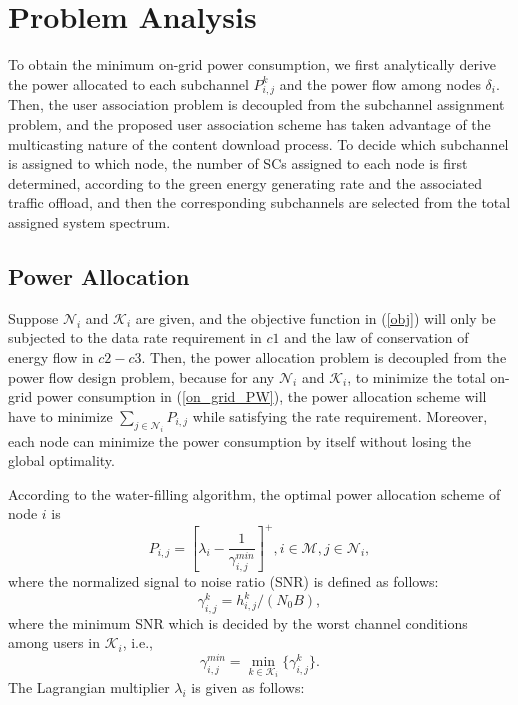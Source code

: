 \documentclass[journal,12pt,onecolumn]{IEEEtran}
\begin{document}
\section{Problem Analysis}
To obtain the minimum on-grid power consumption, we first analytically derive the power allocated to each subchannel $P_{i,j}^k$ and the power flow among nodes $\delta_i$. Then, the user association problem is decoupled from the subchannel assignment problem, and the proposed user association scheme has taken advantage of the multicasting nature of the content download process. To decide which subchannel is assigned to which node, the number of SCs assigned to each node is first determined, according to the green energy generating rate and the associated traffic offload, and then the corresponding subchannels are selected from the total assigned system spectrum. 
\subsection{Power Allocation}
Suppose $\mathcal{N}_i$ and $\mathcal{K}_i$ are given, and the objective function in (\ref{obj}) will only be subjected to the data rate requirement in $c1$ and the law of conservation of energy flow in $c2-c3$. Then, the power allocation problem is decoupled from the power flow design problem, because for any $\mathcal{N}_i$ and $\mathcal{K}_i$, to minimize the total on-grid power consumption in (\ref{on_grid_PW}), the power allocation scheme will have to minimize $\sum\nolimits_{j \in\mathcal{N}_i} {{P_{i,j}}}$ while satisfying the rate requirement. Moreover, each node can minimize the power consumption by itself without losing the global optimality.

According to the water-filling algorithm, the optimal power allocation scheme of node $i$ is
\begin{equation}\label{2a}
P_{i,j}=\left[\lambda_{i}-\frac{1}{\gamma_{i,j}^{min}}\right]^+,i\in\mathcal{M},j\in\mathcal{N}_{i},
\end{equation}
where the normalized signal to noise ratio (SNR) is defined as follows:
\begin{equation}\label{SNR}
\gamma_{i,j}^k={h_{i,j}^k/({N_0 B})},
\end{equation}
where the minimum SNR which is decided by the worst channel conditions among users in $\mathcal{K}_i$, i.e.,
\begin{equation}\label{minSNR}
\gamma_{i,j}^{min}=\min\limits_{k\in\mathcal{K}_i}\{\gamma_{i,j}^k\}.
\end{equation}
The Lagrangian multiplier $\lambda_{i}$ is given as follows:
\end{document}

